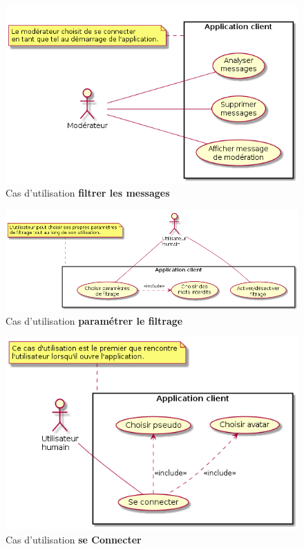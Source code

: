 \documentclass[11pt,dvipsnames,svgnames]{report}
\begin{document}
\begin{center}
\begin{figure}
\includegraphics[scale=0.7]{images/uc-filtrerMessages.png}
\caption{Cas d'utilisation \textbf{filtrer les messages}}
\end{figure}

\begin{figure}
\includegraphics[scale=0.6]{images/uc-parametrerFiltrage.png}
\caption{Cas d'utilisation \textbf{paramétrer le filtrage}}
\end{figure}

\begin{figure}
\includegraphics[scale=0.7]{images/uc-seConnecter.png}
\caption{Cas d'utilisation \textbf{se Connecter}}
\end{figure}

\end{center}
\end{document}
